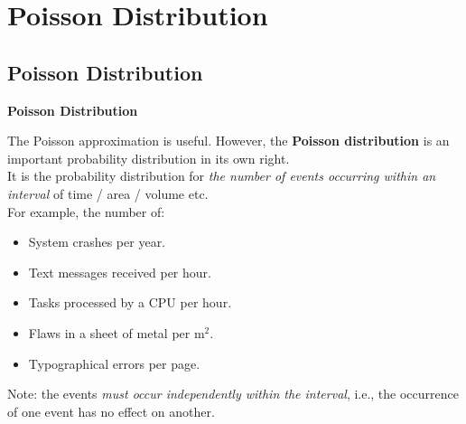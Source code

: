 \documentclass[compress]{beamer}        %
\makeatletter
\newcommand{\tcb}{\textcolor{beamer@blendedblue}}
\makeatother
\begin{document}
\section{Poisson Distribution}
\subsection{Poisson Distribution}
\begin{frame}{\bf \tcb{Poisson Distribution}}

The Poisson approximation is useful. However, the {\bf Poisson distribution} is an important probability distribution in its own right.\\[0.3cm]

It is the probability distribution for \emph{the number of events occurring within an interval} of time / area / volume etc.\\[0.3cm]

For example, the number of:\\[0.0cm]
\begin{itemize}\itemsep0.2cm
\item System crashes per year.
\item Text messages received per hour.
\item Tasks processed by a CPU per hour.
\item Flaws in a sheet of metal per m$^2$.
\item Typographical errors per page.\\[0.3cm]
\end{itemize}
Note: the events \emph{must occur independently within the interval}, i.e., the occurrence of one event has no effect on another.


\end{frame}
\end{document}
